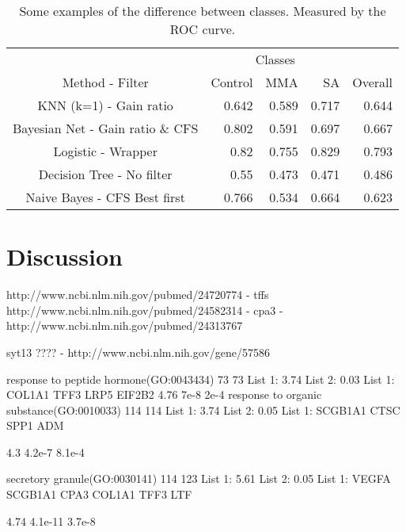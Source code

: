 \documentclass[conference,a4paper]{IEEEtran}
\begin{document}
\begin{table}[h]
	\caption{Some examples of the difference between classes. Measured by the ROC curve.}
	\centering
	\begin{tabular}{c r r r r}
		\hline\hline
		& \multicolumn{3}{c|}{Classes} & \\
		Method - Filter & Control & MMA & SA & \multicolumn{1}{|c}{Overall}\\ [0.2ex]
		\hline 
		KNN (k=1) - Gain ratio & 0.642 & 0.589 & 0.717 & 0.644 \\
		Bayesian Net - Gain ratio \& CFS & 0.802 & 0.591 & 0.697 & 0.667 \\
		Logistic - Wrapper & 0.82 & 0.755 & 0.829 & 0.793 \\
		Decision Tree - No filter & 0.55 & 0.473 & 0.471 & 0.486\\
		Naive Bayes - CFS Best first & 0.766 & 0.534 & 0.664 & 0.623 \\ [1ex]
		\hline
	\end{tabular}
	\label{table:inClassResults}
\end{table}



\section{Discussion}

http://www.ncbi.nlm.nih.gov/pubmed/24720774 - tffs
http://www.ncbi.nlm.nih.gov/pubmed/24582314 - cpa3 - http://www.ncbi.nlm.nih.gov/pubmed/24313767

syt13 ????  - http://www.ncbi.nlm.nih.gov/gene/57586

response to peptide hormone(GO:0043434)	73	73	List 1: 3.74%
List 2: 0.03%
List 1:
COL1A1
TFF3
LRP5
EIF2B2
4.76	7e-8	2e-4
response to organic substance(GO:0010033)	114	114	List 1: 3.74%
List 2: 0.05%
List 1:
SCGB1A1
CTSC
SPP1
ADM

4.3	4.2e-7	8.1e-4


secretory granule(GO:0030141)	114	123	List 1: 5.61%
List 2: 0.05%
List 1:
VEGFA
SCGB1A1
CPA3
COL1A1
TFF3
LTF

4.74	4.1e-11	3.7e-8


\end{document}
